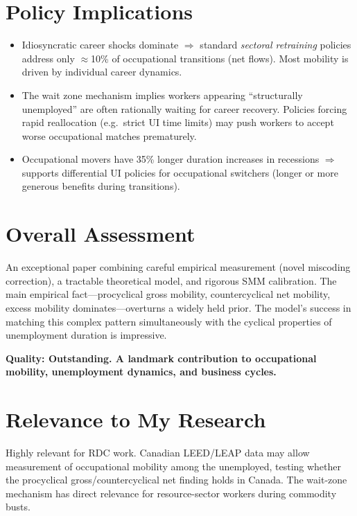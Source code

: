 \section{Policy Implications}

\begin{itemize}
  \item Idiosyncratic career shocks dominate $\Rightarrow$ standard
    \emph{sectoral retraining} policies address only $\approx$10\% of
    occupational transitions (net flows). Most mobility is driven by
    individual career dynamics.
  \item The wait zone mechanism implies workers appearing ``structurally
    unemployed'' are often rationally waiting for career recovery. Policies
    forcing rapid reallocation (e.g.\ strict UI time limits) may push workers
    to accept worse occupational matches prematurely.
  \item Occupational movers have 35\% longer duration increases in recessions
    $\Rightarrow$ supports differential UI policies for occupational switchers
    (longer or more generous benefits during transitions).
\end{itemize}

\section{Overall Assessment}

An exceptional paper combining careful empirical measurement (novel miscoding
correction), a tractable theoretical model, and rigorous SMM calibration.
The main empirical fact---procyclical gross mobility, countercyclical net
mobility, excess mobility dominates---overturns a widely held prior. The
model's success in matching this complex pattern simultaneously with the
cyclical properties of unemployment duration is impressive.

\textbf{Quality: Outstanding. A landmark contribution to occupational
mobility, unemployment dynamics, and business cycles.}

\section{Relevance to My Research}

Highly relevant for RDC work. Canadian LEED/LEAP data may allow measurement
of occupational mobility among the unemployed, testing whether the procyclical
gross/countercyclical net finding holds in Canada. The wait-zone mechanism
has direct relevance for resource-sector workers during commodity busts.

